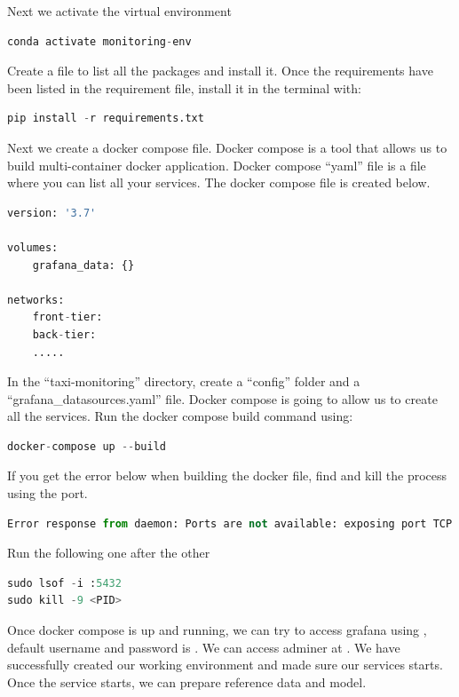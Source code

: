 \documentclass[letterpaper,12pt,notitlepage,twoside]{report}
\begin{document}
Next we activate the virtual environment
\begin{lstlisting}[language=python, numbers=none]
conda activate monitoring-env 
\end{lstlisting}

Create a  file to list all the packages and install it. Once the requirements have been listed in the requirement file, install it in the terminal with:
\begin{lstlisting}[language=python, numbers=none]
pip install -r requirements.txt
\end{lstlisting}

Next we create a docker compose file. Docker compose is a tool that allows us to build multi-container docker application.  Docker compose ``yaml'' file is a file where you can list all your services.  The docker compose file is created below.
\begin{lstlisting}[language=python, numbers=none]
version: '3.7'

volumes: 
	grafana_data: {}

networks:
	front-tier:
	back-tier:
	.....

\end{lstlisting}

In the ``taxi-monitoring'' directory, create a ``config'' folder and a ``grafana\_datasources.yaml'' file. Docker compose is going to allow us to create all the services. Run the docker compose build command using:
\begin{lstlisting}[language=python, numbers=none]
docker-compose up --build
\end{lstlisting}

If you get the error below when building the docker file,  find and kill the process using the port. 

\begin{lstlisting}[language=python, numbers=none]
Error response from daemon: Ports are not available: exposing port TCP 0.0.0.0:5432 -> 0.0.0.0:0: listen tcp 0.0.0.0:5432: bind: address already in use
\end{lstlisting}

Run the following one after the other
\begin{lstlisting}[language=python, numbers=none]
sudo lsof -i :5432
sudo kill -9 <PID>
\end{lstlisting}

Once docker compose is up and running, we can try to access grafana using , default username and password is .  We can access adminer at . We have successfully created our working environment and made sure our services starts. Once the service starts, we can prepare reference data and model. 
\end{document}
